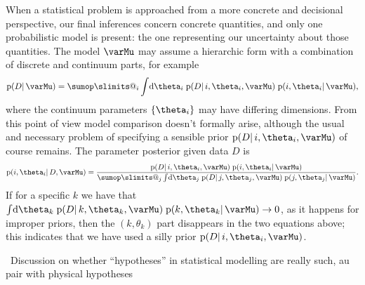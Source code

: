 \documentclass[\ifafour a4paper,12pt,\else a5paper,10pt,\fi%
onecolumn,oneside,article,%
british%
]{memoir}
\makeatletter
\theoremstyle{remark}
\theoremstyle{innote}
\def\sum{\DOTSI\sumop\slimits@}
\newcommand*{\di}{\mathrm{d}}%
\DeclarePairedDelimiter\set{\{}{\}}
\newcommand*{\pf}{\mathrm{p}}%
\renewcommand*{\|}{\mathpunct{|}}
\newcommand*{\puzzle}{\maltese}
\newcommand{\mynote}[1]{ {\color{notecolour}\puzzle\ #1}}
\newcommand*{\yM}{\varMu}
\newcommand*{\yD}{D}
\makeatother
\begin{document}
\bigskip

When a statistical problem is approached from a more concrete and
decisional perspective, our final inferences concern concrete quantities,
and only one probabilistic model is present: the one representing our
uncertainty about those quantities. The model $\yM$ may assume a hierarchic form
with a combination of discrete and continuum parts, for example
\begin{equation}
  \label{eq:example_model_mixed}
  \pf(\yD \| \yM) =
 \sum_i \int\!\di\theta_i\; \pf(\yD \| i, \theta_i,\yM)\;
  \pf(i, \theta_i \| \yM),
\end{equation}
where the continuum parameters $\set{\theta_i}$ may have differing
dimensions. From this point of view model comparison doesn't formally
arise, although the usual and necessary problem of specifying a sensible
prior $\pf(\yD \| i, \theta_i,\yM)$ of course remains. The parameter
posterior given data $\yD$ is
\begin{equation}
  \label{eq:param_posterior_model_mixed}
  \pf(i, \theta_i \| \yD, \yM) =
  \frac{\pf(\yD \| i, \theta_i,\yM)\;  \pf(i, \theta_i \| \yM)
  }{
 \sum_j \int\!\di\theta_j\; \pf(\yD \| j, \theta_j,\yM)\;
  \pf(j, \theta_j \| \yM)
  }.
\end{equation}
If for a specific $k$ we have that
$\int\!\di\theta_k\; \pf(\yD \| k, \theta_k,\yM)\; \pf(k, \theta_k \| \yM)
\to 0$, as it happens for improper priors, then the $(k,\theta_k)$ part
disappears in the two equations above; this indicates that we have used a
silly prior $\pf(\yD \| i, \theta_i,\yM)$.




\mynote{Discussion on whether \enquote{hypotheses} in statistical modelling
are really such, au pair with physical hypotheses}
\end{document}
